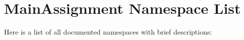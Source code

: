 \section{Main\-Assignment Namespace List}
Here is a list of all documented namespaces with brief descriptions:\begin{CompactList}
\item{}
\end{CompactList}
